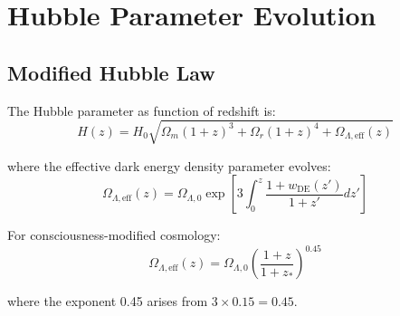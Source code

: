 \section{Hubble Parameter Evolution}

\subsection{Modified Hubble Law}

\begin{theorem}\label{thm:hubble-modified}
The Hubble parameter as function of redshift is:
\begin{equation}
\boxed{H(z) = H_0 \sqrt{\Omega_m (1+z)^3 + \Omega_r (1+z)^4 + \Omega_{\Lambda,\text{eff}}(z)}}
\end{equation}

where the effective dark energy density parameter evolves:
\begin{equation}
\Omega_{\Lambda,\text{eff}}(z) = \Omega_{\Lambda,0} \exp\left[ 3 \int_0^z \frac{1 + w_{\text{DE}}(z')}{1+z'} dz' \right]
\end{equation}

For consciousness-modified cosmology:
\begin{equation}
\Omega_{\Lambda,\text{eff}}(z) = \Omega_{\Lambda,0} \left( \frac{1+z}{1+z_*} \right)^{0.45}
\end{equation}

where the exponent 0.45 arises from $3 \times 0.15 = 0.45$.
\end{theorem}

